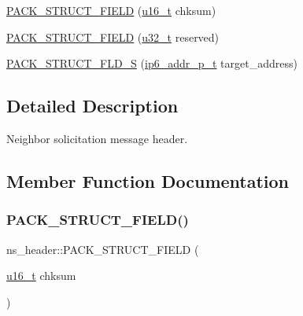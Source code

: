 \begin{DoxyCompactItemize}
\hyperlink{structns__header_a8b960b87442f2197345dcb017490458c}{P\+A\+C\+K\+\_\+\+S\+T\+R\+U\+C\+T\+\_\+\+F\+I\+E\+LD} (\hyperlink{group__compiler__abstraction_ga77570ac4fcab86864fa1916e55676da2}{u16\+\_\+t} chksum)
\item 
\hyperlink{structns__header_ac7f435b2b9fc1cedabca99289e055a7c}{P\+A\+C\+K\+\_\+\+S\+T\+R\+U\+C\+T\+\_\+\+F\+I\+E\+LD} (\hyperlink{group__compiler__abstraction_ga4c14294869aceba3ef9d4c0c302d0f33}{u32\+\_\+t} reserved)
\item 
\hyperlink{structns__header_a9afca416f5a3caff1d19744d8f89a571}{P\+A\+C\+K\+\_\+\+S\+T\+R\+U\+C\+T\+\_\+\+F\+L\+D\+\_\+S} (\hyperlink{native_2lwip_2src_2include_2lwip_2prot_2ip6_8h_a560932a657f17ec5a0a3a78a1ce7e60a}{ip6\+\_\+addr\+\_\+p\+\_\+t} target\+\_\+address)
\end{DoxyCompactItemize}


\subsection{Detailed Description}
Neighbor solicitation message header. 

\subsection{Member Function Documentation}
\mbox{\label{structns__header_a8b960b87442f2197345dcb017490458c}} 
\subsubsection{\texorpdfstring{P\+A\+C\+K\+\_\+\+S\+T\+R\+U\+C\+T\+\_\+\+F\+I\+E\+L\+D()}{PACK\_STRUCT\_FIELD()}\hspace{0.1cm}{\footnotesize\ttfamily [1/4]}}
{\footnotesize\ttfamily ns\+\_\+header\+::\+P\+A\+C\+K\+\_\+\+S\+T\+R\+U\+C\+T\+\_\+\+F\+I\+E\+LD (\begin{DoxyParamCaption}\item[{\hyperlink{group__compiler__abstraction_ga77570ac4fcab86864fa1916e55676da2}{u16\+\_\+t}}]{chksum }\end{DoxyParamCaption})}

\mbox{\label{structns__header_a8b960b87442f2197345dcb017490458c}} 
